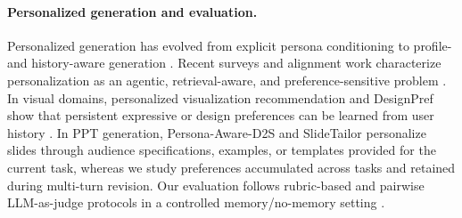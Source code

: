 \paragraph{Personalized generation and evaluation.}
Personalized generation has evolved from explicit persona conditioning to
profile- and history-aware generation
\citep{li2016persona,wu2021splitmemory,salemi2023lamp,mysore2023pearl,jiang2025personamem}.
Recent surveys and alignment work characterize personalization as an agentic,
retrieval-aware, and preference-sensitive problem
\citep{zhang2024personalizationllm,li2025personalizationragagent}. In visual
domains, personalized visualization recommendation and DesignPref show that
persistent expressive or design preferences can be learned from user history
\citep{qian2022personalizedvis,peng2025designpref}. In PPT generation,
Persona-Aware-D2S and SlideTailor personalize slides through audience
specifications, examples, or templates provided for the current task, whereas
we study preferences accumulated across tasks and retained during multi-turn
revision. Our evaluation follows rubric-based and pairwise LLM-as-judge
protocols in a controlled memory/no-memory setting
\citep{liu2023geval,zheng2023llmasjudge,kim2023prometheus,zhu2023judgelm,li2024arenahard}.
